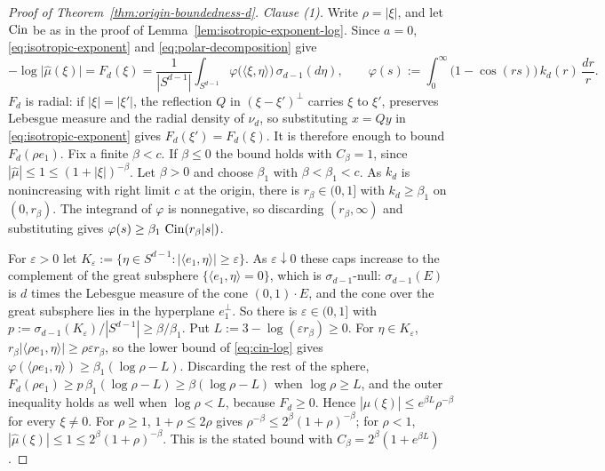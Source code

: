 \begin{proof}[Proof of Theorem~\ref{thm:origin-boundedness-d}]
\emph{Clause (1).} Write $\rho = |\xi|$, and let $\operatorname{Cin}$ be as in the proof of
Lemma~\ref{lem:isotropic-exponent-log}. Since $a = 0$, \ref{eq:isotropic-exponent} and
\ref{eq:polar-decomposition} give
\[
  -\log\bigl|\widehat\mu(\xi)\bigr| = F_d(\xi)
   = \frac{1}{|S^{d-1}|}\int_{S^{d-1}}\varphi\bigl(\langle\xi,\eta\rangle\bigr)\,\sigma_{d-1}(d\eta),
  \qquad
  \varphi(s) := \int_0^\infty\bigl(1 - \cos(rs)\bigr)\,k_d(r)\,\frac{dr}{r} .
\]
$F_d$ is radial: if $|\xi| = |\xi'|$, the reflection $Q$ in $(\xi - \xi')^\perp$ carries $\xi$ to
$\xi'$, preserves Lebesgue measure and the radial density of $\nu_d$, so substituting $x = Qy$ in
\ref{eq:isotropic-exponent} gives $F_d(\xi') = F_d(\xi)$. It is therefore enough to bound
$F_d(\rho e_1)$. Fix a finite $\beta < c$. If $\beta \le 0$ the bound holds with $C_\beta = 1$,
since $|\widehat\mu| \le 1 \le (1+|\xi|)^{-\beta}$. Let $\beta > 0$ and choose $\beta_1$ with
$\beta < \beta_1 < c$. As $k_d$ is nonincreasing with right limit $c$ at the origin, there is
$r_\beta \in (0,1]$ with $k_d \ge \beta_1$ on $(0,r_\beta)$. The integrand of $\varphi$ is
nonnegative, so discarding $(r_\beta,\infty)$ and substituting gives
$\varphi(s) \ge \beta_1\,\operatorname{Cin}(r_\beta|s|)$.

For $\varepsilon > 0$ let $K_\varepsilon := \{\eta \in S^{d-1} : |\langle e_1,\eta\rangle| \ge
\varepsilon\}$. As $\varepsilon \downarrow 0$ these caps increase to the complement of the great
subsphere $\{\langle e_1,\eta\rangle = 0\}$, which is $\sigma_{d-1}$-null: $\sigma_{d-1}(E)$ is $d$
times the Lebesgue measure of the cone $(0,1)\cdot E$, and the cone over the great subsphere lies in
the hyperplane $e_1^\perp$. So there is $\varepsilon \in (0,1]$ with
$p := \sigma_{d-1}(K_\varepsilon)/|S^{d-1}| \ge \beta/\beta_1$. Put
$L := 3 - \log(\varepsilon r_\beta) \ge 0$. For $\eta \in K_\varepsilon$,
$r_\beta|\langle\rho e_1,\eta\rangle| \ge \rho\varepsilon r_\beta$, so the lower bound of
\ref{eq:cin-log} gives $\varphi(\langle\rho e_1,\eta\rangle) \ge \beta_1(\log\rho - L)$. Discarding
the rest of the sphere, $F_d(\rho e_1) \ge p\,\beta_1(\log\rho - L) \ge \beta(\log\rho - L)$ when
$\log\rho \ge L$, and the outer inequality holds as well when $\log\rho < L$, because $F_d \ge 0$.
Hence $|\widehat\mu(\xi)| \le e^{\beta L}\rho^{-\beta}$ for every $\xi \ne 0$. For $\rho \ge 1$,
$1 + \rho \le 2\rho$ gives $\rho^{-\beta} \le 2^\beta(1+\rho)^{-\beta}$; for $\rho < 1$,
$|\widehat\mu(\xi)| \le 1 \le 2^\beta(1+\rho)^{-\beta}$. This is the stated bound with
$C_\beta = 2^\beta(1 + e^{\beta L})$.


\end{proof}
